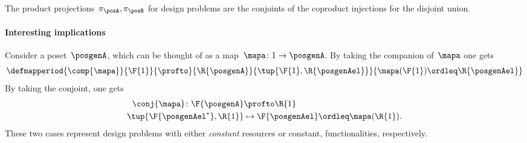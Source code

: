 \begin{example}
    The product projections~$\pi_\posA, \pi_\posB$ for design problems are the conjoints of the coproduct injections for the disjoint union.
\end{example}

\paragraph{Interesting implications}
Consider a poset~$\posgenA$, which can be thought of as a map~$\mapa \colon 1\to \posgenA$.
By taking the companion of~$\mapa$ one gets
\begin{equation}
    \defmapperiod{
        \comp{\mapa}
    }{
        \F{1} 
    }{
        \profto 
    }{
        \R{\posgenA} 
    }{
        \tup{\F{1},\R{\posgenAel}}
    }{
        \mapa(\F{1})\ordleq \R{\posgenAel}
    }
\end{equation}
By taking the conjoint, one gets
\begin{equation}
    \begin{aligned}
        \conj{\mapa}\colon \F{\posgenA} & \profto \R{1}                               \\
        \tup{\F{\posgenAel^*},\R{1}}    & \mapsto \F{\posgenAel}\ordleq \mapa(\R{1}).
    \end{aligned}
\end{equation}
These two cases represent design problems with either \emph{constant} resources or constant, functionalities, respectively.
